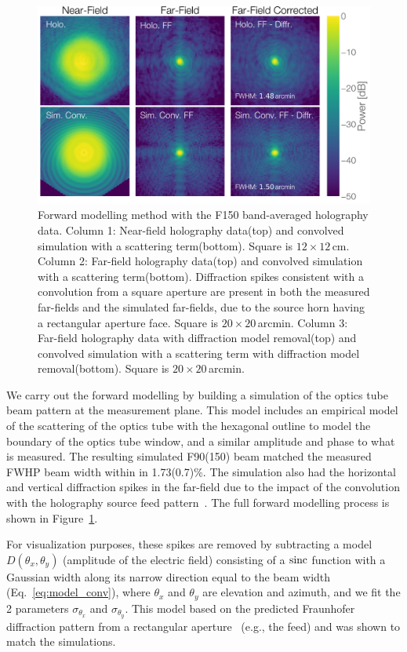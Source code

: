 \begin{figure}[t!]
    \centering
    \includegraphics[width = .9\textwidth]{Figures/forward_convolve.pdf}
    \caption{Forward modelling method with the F150 band-averaged holography data. Column 1:  Near-field holography data(top) and convolved simulation with a scattering term(bottom).  Square is $12\times12\,$cm.  Column 2: Far-field holography data(top) and convolved simulation with a scattering term(bottom).  Diffraction spikes consistent with a convolution from a square aperture are present in both the measured far-fields and the simulated far-fields, due to the source horn having a rectangular aperture face.  Square is $20\times20\,$arcmin.  Column 3:  Far-field holography data with diffraction model removal(top) and convolved simulation with a scattering term with diffraction model removal(bottom). Square is $20\times20\,$arcmin.}
    \label{fig:forward_model}
\end{figure}

We carry out the forward modelling by building a simulation of the optics tube beam pattern at the measurement plane.  This model includes an empirical model of the scattering of the optics tube with the hexagonal outline to model the boundary of the optics tube window, and a similar amplitude and phase to what is measured.  The resulting simulated F90(150) beam matched the measured FWHP beam width within in 1.73(0.7)\%.  The simulation also had the horizontal and vertical diffraction spikes in the far-field due to the impact of the convolution with the holography source feed pattern~\cite{2005ifo..book.....G}.  The full forward modelling process is shown in Figure~\ref{fig:forward_model}.

For visualization purposes, these spikes are removed by subtracting a model $D(\theta_x,\theta_y)$ (amplitude of the electric field) consisting of a $\operatorname{sinc}$ function with a Gaussian width along its narrow direction equal to the beam width (Eq.~\ref{eq:model_conv}), where $\theta_x$ and $\theta_y$ are elevation and azimuth, and we fit the 2 parameters $\sigma_{\theta_x}$ and $\sigma_{\theta_y}$.  This model based on the predicted Fraunhofer diffraction pattern from a rectangular aperture~\cite{2005ifo..book.....G} (e.g., the feed) and was shown to match the simulations.

